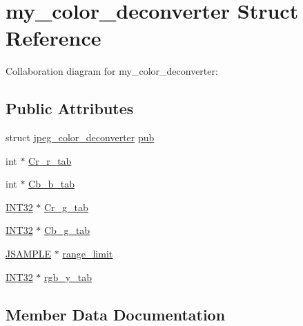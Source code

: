 \hypertarget{structmy__color__deconverter}{}\section{my\+\_\+color\+\_\+deconverter Struct Reference}
\label{structmy__color__deconverter}


Collaboration diagram for my\+\_\+color\+\_\+deconverter\+:
\subsection*{Public Attributes}
\begin{DoxyCompactItemize}
\item 
struct \hyperlink{structjpeg__color__deconverter}{jpeg\+\_\+color\+\_\+deconverter} \hyperlink{structmy__color__deconverter_a54bf241de985ca2e06da2bbee14e745a}{pub}
\item 
int $\ast$ \hyperlink{structmy__color__deconverter_a25c4ee8d1066262c23a8181758eb0231}{Cr\+\_\+r\+\_\+tab}
\item 
int $\ast$ \hyperlink{structmy__color__deconverter_aa40b60773afd04e0b076f83ed00069c9}{Cb\+\_\+b\+\_\+tab}
\item 
\hyperlink{jmorecfg_8h_a0cb58e7e6f0bad369840a52e54a56ae0}{I\+N\+T32} $\ast$ \hyperlink{structmy__color__deconverter_ab44aebbe0bd6d32aec678c71f7758bfc}{Cr\+\_\+g\+\_\+tab}
\item 
\hyperlink{jmorecfg_8h_a0cb58e7e6f0bad369840a52e54a56ae0}{I\+N\+T32} $\ast$ \hyperlink{structmy__color__deconverter_abb16c33e195531366787333d6b7a2ef6}{Cb\+\_\+g\+\_\+tab}
\item 
\hyperlink{jmorecfg_8h_a552ee7787d3fd8b5f5f5cc3e2145a647}{J\+S\+A\+M\+P\+L\+E} $\ast$ \hyperlink{structmy__color__deconverter_a8bae79f8adf764aa32e84a8f40b5b18b}{range\+\_\+limit}
\item 
\hyperlink{jmorecfg_8h_a0cb58e7e6f0bad369840a52e54a56ae0}{I\+N\+T32} $\ast$ \hyperlink{structmy__color__deconverter_ad34e0f9d33aaf4b6329e65a95ec8130e}{rgb\+\_\+y\+\_\+tab}
\end{DoxyCompactItemize}


\subsection{Member Data Documentation}
\hypertarget{structmy__color__deconverter_aa40b60773afd04e0b076f83ed00069c9}{}
